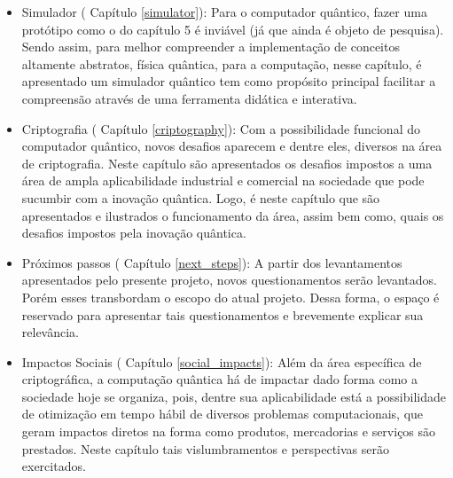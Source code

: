\begin{itemize}
  \item Simulador ( Capítulo \ref{simulator}): Para o computador quântico, fazer uma protótipo como o do capítulo 5 é inviável (já que ainda é objeto de pesquisa). Sendo assim, para melhor compreender a implementação de conceitos altamente abstratos, física quântica, para a computação, nesse capítulo, é apresentado um simulador quântico tem como propósito principal facilitar a compreensão através de uma ferramenta didática e interativa.
  \item Criptografia ( Capítulo \ref{criptography}): Com a possibilidade funcional do computador quântico, novos desafios aparecem e dentre eles, diversos na área de criptografia. Neste capítulo são apresentados os desafios impostos a uma área de ampla aplicabilidade industrial e comercial na sociedade que pode sucumbir com a inovação quântica. Logo, é neste capítulo que são apresentados e ilustrados o funcionamento da área, assim bem como, quais os desafios impostos pela inovação quântica.
  \item Próximos passos ( Capítulo \ref{next_steps}): A partir dos levantamentos apresentados pelo presente projeto, novos questionamentos serão levantados. Porém esses transbordam o escopo do atual projeto. Dessa forma, o espaço é reservado para apresentar tais questionamentos e brevemente explicar sua relevância.
  \item Impactos Sociais ( Capítulo \ref{social_impacts}): Além da área específica de criptográfica, a computação quântica há de impactar dado forma como a sociedade hoje se organiza, pois, dentre sua aplicabilidade está a possibilidade de otimização em tempo hábil de diversos problemas computacionais, que geram impactos diretos na forma como produtos, mercadorias e serviços são prestados. Neste capítulo tais vislumbramentos e perspectivas serão exercitados.
\end{itemize}

\newpage

